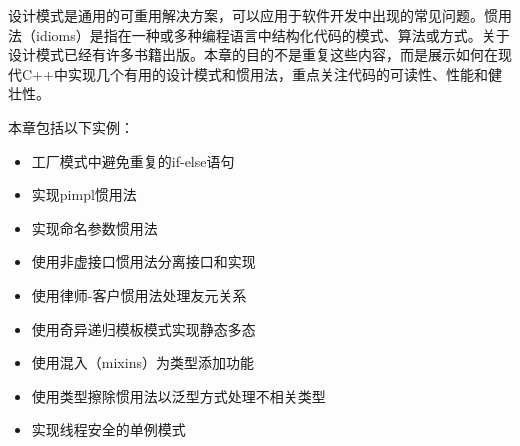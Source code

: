 
设计模式是通用的可重用解决方案，可以应用于软件开发中出现的常见问题。惯用法（idioms）是指在一种或多种编程语言中结构化代码的模式、算法或方式。关于设计模式已经有许多书籍出版。本章的目的不是重复这些内容，而是展示如何在现代C++中实现几个有用的设计模式和惯用法，重点关注代码的可读性、性能和健壮性。

本章包括以下实例：

\begin{itemize}
\item
工厂模式中避免重复的if-else语句

\item
实现pimpl惯用法

\item
实现命名参数惯用法

\item
使用非虚接口惯用法分离接口和实现

\item
使用律师-客户惯用法处理友元关系

\item
使用奇异递归模板模式实现静态多态

\item
使用混入（mixins）为类型添加功能

\item
使用类型擦除惯用法以泛型方式处理不相关类型

\item
实现线程安全的单例模式
\end{itemize}
